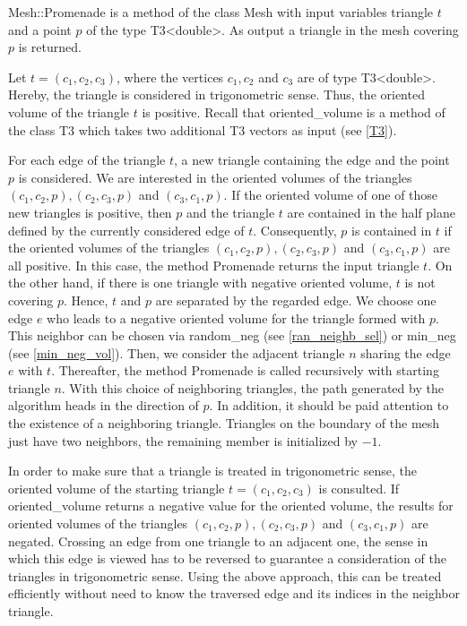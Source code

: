 \documentclass[10pt]{article}
\begin{document}
{\ttfamily Mesh::Promenade} is a method of the class {\ttfamily Mesh} with input variables triangle $t$ and a point $p$ of the type {\ttfamily T3<double>}. As output a triangle in the mesh covering $p$ is returned. 

Let $ t = (c_1,c_2,c_3)$, where the vertices $c_1,c_2$ and $c_3$ are of type {\ttfamily T3<double>}. Hereby, the triangle is considered in trigonometric sense. Thus, the oriented volume of the triangle $t$ is positive. Recall that {\ttfamily oriented\_volume} is a method of the class {\ttfamily T3} which takes two additional {\ttfamily T3} vectors as input (see \ref{T3}).

For each edge of the triangle $t$, a new triangle containing the edge and the point $p$ is considered. We are interested in the oriented volumes of the triangles $(c_1,c_2,p), (c_2,c_3,p)$ and $(c_3,c_1,p)$. If the oriented volume of one of those new triangles is positive, then $p$ and the triangle $t$ are contained in the half plane defined by the currently considered edge of $t$. Consequently, $p$ is contained in $t$ if the oriented volumes of the triangles $(c_1,c_2,p), (c_2,c_3,p)$ and $(c_3,c_1,p)$ are all positive. In this case, the method {\ttfamily Promenade} returns the input triangle $t$. On the other hand, if there is one triangle with negative oriented volume, $t$ is not covering $p$. Hence, $t$ and $p$ are separated by the regarded edge. We choose one edge $e$ who leads to a negative oriented volume for the triangle formed with $p$. This neighbor can be chosen via {\ttfamily random\_neg} (see \ref{ran_neighb_sel}) or {\ttfamily min\_neg} (see \ref{min_neg_vol}). Then, we consider the adjacent triangle $n$ sharing the edge $e$ with $t$. Thereafter, the method {\ttfamily Promenade} is called recursively with starting triangle $n$. With this choice of neighboring triangles, the path generated by the algorithm heads in the direction of $p$. In addition, it should be paid attention to the existence of a neighboring triangle. Triangles on the boundary of the mesh just have two neighbors, the remaining member is initialized by $-1$.

In order to make sure that a triangle is treated in trigonometric sense, the oriented volume of the starting triangle $t = (c_1,c_2,c_3)$ is consulted. If {\ttfamily oriented\_volume} returns a negative value for the oriented volume, the results for oriented volumes of the triangles $(c_1,c_2,p), (c_2,c_3,p)$ and $(c_3,c_1,p)$ are negated. Crossing an edge from one triangle to an adjacent one, the sense in which this edge is viewed has to be reversed to guarantee a consideration of the triangles in trigonometric sense. Using the above approach, this can be treated efficiently without need to know the traversed edge and its indices in the neighbor triangle.
\end{document}
